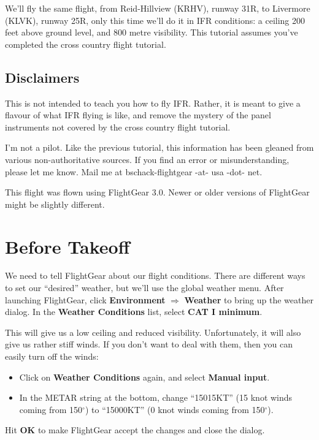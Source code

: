 We'll fly the same flight, from Reid-Hillview (KRHV), runway 31R, to
Livermore (KLVK), runway 25R, only this time we'll do it in IFR
conditions: a ceiling 200 feet above ground level, and 800 metre
visibility.  This tutorial assumes you've completed the cross country
flight tutorial.
\subsection{Disclaimers}

This is not intended to teach you how to fly IFR.  Rather, it is meant
to give a flavour of what IFR flying is like, and remove the mystery
of the panel instruments not covered by the cross country flight
tutorial.

I'm not a pilot.  Like the previous tutorial, this information has
been gleaned from various non-authoritative sources.  If you find an
error or misunderstanding, please let me know.  Mail me at
bschack-flightgear -at- usa -dot- net.

This flight was flown using FlightGear 3.0.  Newer or older versions
of FlightGear might be slightly different.

\section{Before Takeoff}

We need to tell FlightGear about our flight conditions.  There are
different ways to set our ``desired'' weather, but we'll use the
global weather menu.  After launching FlightGear, click
\textbf{\textsf{Environment}} $\Rightarrow$ \textbf{\textsf{Weather}}
to bring up the weather dialog.  In the \textbf{\textsf{Weather
    Conditions}} list, select \textbf{\textsf{CAT I minimum}}.

This will give us a low ceiling and reduced visibility.
Unfortunately, it will also give us rather stiff winds.  If you don't
want to deal with them, then you can easily turn off the winds:

\begin{itemize}
\item Click on \textbf{\textsf{Weather Conditions}} again, and select
  \textbf{\textsf{Manual input}}.
\item In the METAR string at the bottom, change ``15015KT'' (15 knot
  winds coming from 150$^\circ$) to ``15000KT'' (0 knot winds coming
  from 150$^\circ$).
\end{itemize}

Hit \textbf{\textsf{OK}} to make FlightGear accept the changes and
close the dialog.  

